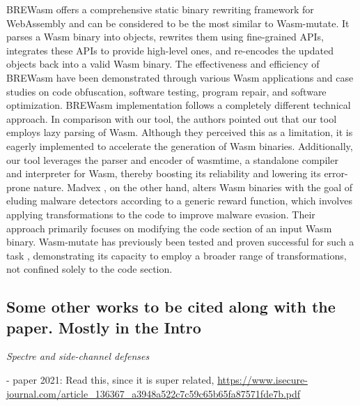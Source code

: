 \documentclass[sigplan,screen]{acmart}
\newcommand*\badge[1]{ \colorbox{red}{\color{white}#1}}
\newcommand{\tool}{Wasm-mutate\xspace}
\newcommand{\wasm}{Wasm\xspace}
\newcommand{\Wasm}{WebAssembly\xspace}
\newcommand{\todo}[1]{%
\refstepcounter{todo}
\noindent\textbf{\badge{TODO}} {\color{red}#1}
\addcontentsline{td}{todo}
{\color{red}\thesection.\thetodo\xspace #1}}
\begin{document}

BREWasm \cite{rewritingtool2023} offers a comprehensive static binary rewriting framework for \Wasm and can be considered to be the most similar to \tool. 
It parses a Wasm binary into objects, rewrites them using fine-grained APIs, integrates these APIs to provide high-level ones, and re-encodes the updated objects back into a valid Wasm binary. 
The effectiveness and efficiency of BREWasm have been demonstrated through various Wasm applications and case studies on code obfuscation, software testing, program repair, and software optimization. 
BREWasm implementation follows a completely different technical approach.
In comparison with our tool, the authors pointed out that our tool employs lazy parsing of Wasm. 
Although they perceived this as a limitation, it is eagerly implemented to accelerate the generation of \wasm binaries.
Additionally, our tool leverages the parser and encoder of wasmtime, a standalone compiler and interpreter for Wasm, thereby boosting its reliability and lowering its error-prone nature.
Madvex \cite{madvex}, on the other hand, alters Wasm binaries with the goal of eluding malware detectors according to a generic reward function, which involves applying transformations to the code to improve malware evasion. 
Their approach primarily focuses on modifying the code section of an input Wasm binary. 
\tool has previously been tested and proven successful for such a task \cite{CABRERAARTEAGA2023103296}, demonstrating its capacity to employ a broader range of transformations, not confined solely to the code section.



\subsection{Some other works to be cited along with the paper. Mostly in the Intro}

\emph{Spectre and side-channel defenses}

- paper 2021: Read this, since it is super related, \url{https://www.isecure-journal.com/article_136367_a3948a522c7c59c65b65fa87571fde7b.pdf} \cite{WasmSpectre}
\end{document}
